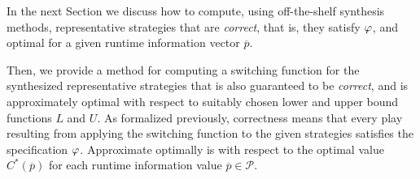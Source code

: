  In the next Section we discuss how to compute, using off-the-shelf synthesis methods, representative strategies that are \emph{correct}, that is, they satisfy $\varphi$, and optimal for a given runtime information vector $\overline{p}$.

 Then, we provide a method for computing a switching function
 for the synthesized representative strategies that is also guaranteed to be \emph{correct}, and is approximately optimal with respect to suitably chosen lower and upper bound functions $L$ and $U$. As formalized previously, correctness means that every play resulting from applying the switching function to the given strategies satisfies the specification $\varphi$. Approximate optimally is with respect to the optimal value $C^\ast(\overline{p})$ for each runtime information value $\overline{p} \in \mathcal P$.



